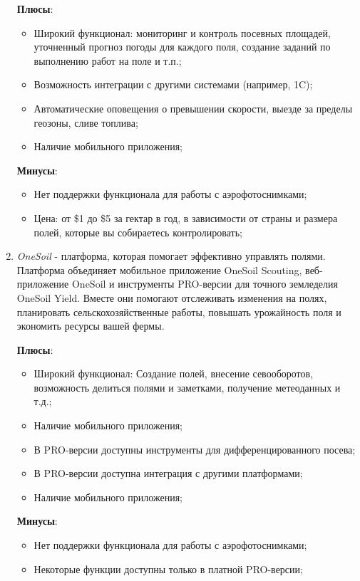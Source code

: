 \begin{enumerate}
        \textbf{Плюсы}:  
        \begin{itemize}
                \item Широкий функционал: мониторинг и контроль посевных площадей, уточненный прогноз погоды для каждого поля, создание заданий по выполнению работ на поле и т.п.;
                \item Возможность интеграции с другими системами (например, 1C);
                \item Автоматические оповещения о превышении скорости, выезде за пределы геозоны, сливе топлива;
                \item Наличие мобильного приложения; 
        \end{itemize}
        \textbf{Минусы}:
        \begin{itemize}
                \item Нет поддержки функционала для работы с аэрофотоснимками;
                \item Цена: от \$1 до \$5 за гектар в год, в зависимости от страны и размера полей, которые вы собираетесь контролировать;
        \end{itemize}


    \item \textit{OneSoil} \cite{onesoil} - платформа, которая помогает эффективно управлять полями. Платформа объединяет мобильное приложение OneSoil Scouting, веб-приложение OneSoil и инструменты PRO-версии для точного земледелия OneSoil Yield. Вместе они помогают отслеживать изменения на полях, планировать сельскохозяйственные работы, повышать урожайность поля и экономить ресурсы вашей фермы.
         
        \textbf{Плюсы}:  
        \begin{itemize}
                \item Широкий функционал: Создание полей, внесение севооборотов, возможность делиться полями и заметками, получение метеоданных и т.д.; 
                \item Наличие мобильного приложения;
                \item В PRO-версии доступны инструменты для дифференцированного посева;
                \item В PRO-версии доступна интеграция с другими платформами;
                \item Наличие мобильного приложения; 
        \end{itemize}
        \textbf{Минусы}:
        \begin{itemize}
                \item Нет поддержки функционала для работы с аэрофотоснимками;
                \item Некоторые функции доступны только в платной PRO-версии;
        \end{itemize}




\end{enumerate}
